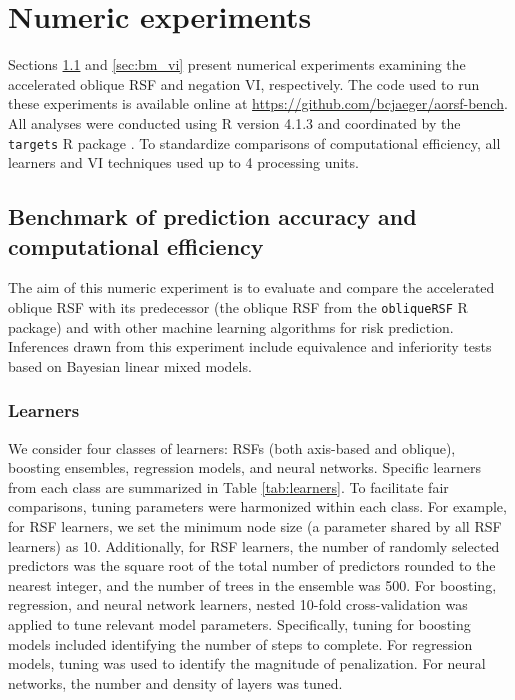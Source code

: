 \documentclass{article}\usepackage[]{graphicx}\usepackage[]{xcolor}
\newcommand{\tabref}[1]{Table \ref{#1}}
\begin{document}
\section{Numeric experiments} \label{sec:numeric}



Sections \ref{sec:bm_pred} and \ref{sec:bm_vi} present numerical experiments examining the accelerated oblique RSF and negation VI, respectively. The code used to run these experiments is available online at \href{https://github.com/bcjaeger/aorsf-bench}{https://github.com/bcjaeger/aorsf-bench}. All analyses were conducted using R version 4.1.3 and coordinated by the \texttt{targets} R package \citep{targets}. To standardize comparisons of computational efficiency, all learners and VI techniques used up to 4 processing units.

\subsection{Benchmark of prediction accuracy and computational efficiency} \label{sec:bm_pred}

The aim of this numeric experiment is to evaluate and compare the accelerated oblique RSF with its predecessor (the oblique RSF from the \texttt{obliqueRSF} R package) and with other machine learning algorithms for risk prediction. Inferences drawn from this experiment include equivalence and inferiority tests based on Bayesian linear mixed models.

\subsubsection{Learners} \label{sec:learners}

We consider four classes of learners: RSFs (both axis-based and oblique), boosting ensembles, regression models, and neural networks. Specific learners from each class are summarized in \tabref{tab:learners}. To facilitate fair comparisons, tuning parameters were harmonized within each class. For example, for RSF learners, we set the minimum node size (a parameter shared by all RSF learners) as 10. Additionally, for RSF learners, the number of randomly selected predictors was the square root of the total number of predictors rounded to the nearest integer, and the number of trees in the ensemble was 500. For boosting, regression, and neural network learners, nested 10-fold cross-validation was applied to tune relevant model parameters. Specifically, tuning for boosting models included identifying the number of steps to complete. For regression models, tuning was used to identify the magnitude of penalization. For neural networks, the number and density of layers was tuned.
\end{document}
